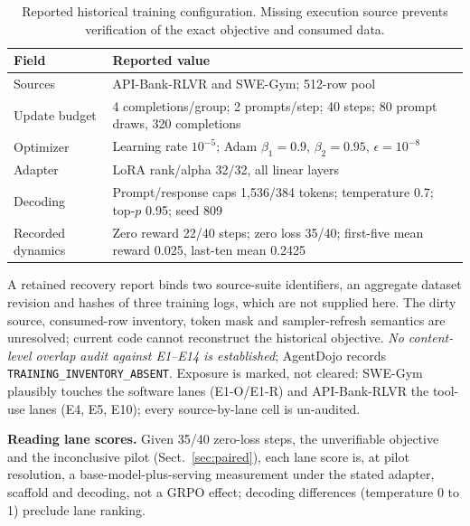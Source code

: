 \documentclass[a4paper,runningheads]{llncs}
\begin{document}
\begin{table}[t]
\caption{Reported historical training configuration. Missing execution source
prevents verification of the exact objective and consumed data.}
\label{tab:training}\centering\small\setlength{\tabcolsep}{3pt}
\begin{tabularx}{\textwidth}{@{}p{}Y@{}}\toprule
Field & Reported value \\\midrule
Sources & API-Bank-RLVR and SWE-Gym; 512-row pool \\
Update budget & 4 completions/group; 2 prompts/step; 40 steps; 80 prompt draws, 320 completions \\
Optimizer & Learning rate $10^{-5}$; Adam $\beta_1=0.9$, $\beta_2=0.95$, $\epsilon=10^{-8}$ \\
Adapter & LoRA rank/alpha 32/32, all linear layers \\
Decoding & Prompt/response caps 1,536/384 tokens; temperature 0.7; top-$p$ 0.95; seed 809 \\
Recorded dynamics & Zero reward 22/40 steps; zero loss 35/40; first-five mean reward 0.025, last-ten mean 0.2425 \\\bottomrule
\end{tabularx}
\end{table}

A retained recovery report binds two source-suite identifiers, an aggregate
dataset revision and hashes of three training logs, which are not supplied
here. The dirty source, consumed-row inventory, token mask and sampler-refresh
semantics are unresolved; current code cannot reconstruct the historical
objective. \emph{No content-level overlap audit against E1--E14 is
established}; AgentDojo records \texttt{TRAINING\_INVENTORY\_ABSENT}. Exposure
is marked, not cleared: SWE-Gym plausibly touches the software lanes
(E1-O/E1-R) and API-Bank-RLVR the tool-use lanes (E4, E5, E10); every
source-by-lane cell is un-audited.

\textbf{Reading lane scores.} Given 35/40 zero-loss steps, the unverifiable
objective and the inconclusive pilot (Sect.~\ref{sec:paired}), each lane score is, at
pilot resolution, a base-model-plus-serving measurement under the stated
adapter, scaffold and decoding, not a GRPO effect; decoding differences
(temperature 0 to 1) preclude lane ranking.
\end{document}
